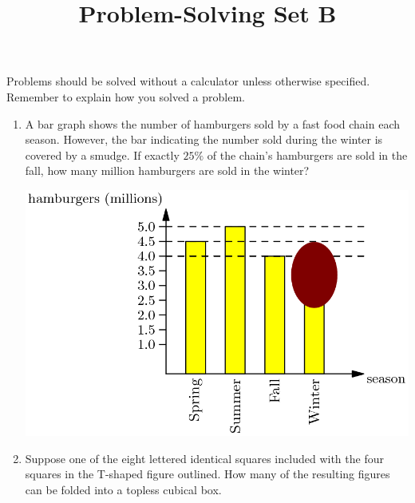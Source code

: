\documentclass{article}
\title{Problem-Solving Set B}
\author{}
\date{}
\begin{document}
\maketitle
\noindent Problems should be solved without a calculator unless otherwise specified.
Remember to explain how you solved a problem.
\begin{multicols*}{2}
    \begin{enumerate}
        \item A bar graph shows the number of hamburgers sold by a fast food chain each season.
            However, the bar indicating the number sold during the winter is covered by a smudge.
            If exactly $25\%$ of the chain's hamburgers are sold in the fall, how many million hamburgers are sold in the winter?
            \begin{center}
                \includegraphics[scale=0.2]{5-2_bar_graph.png}
            \end{center}
            \vspace{3cm}
        \item Suppose one of the eight lettered identical squares included with the four squares in the T-shaped figure outlined.
            How many of the resulting figures can be folded into a topless cubical box.
            \begin{center}
\end{center}
\end{enumerate}
\end{multicols*}
\end{document}
